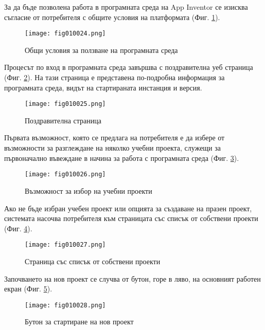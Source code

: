 За да бъде позволена работа в програмната среда на App Inventor се изисква съгласие от потребителя с общите условия на платформата (Фиг. \ref{fig010024}).

\begin{figure}[H]
  \centering
  \texttt{[image: fig010024.png]}
  \caption{Общи условия за ползване на програмната среда}
\label{fig010024}
\end{figure}

Процесът по вход в програмната среда завършва с поздравителна уеб страница (Фиг. \ref{fig010025}). На тази страница е представена по-подробна информация за програмната среда, видът на стартираната инстанция и версия. 

\begin{figure}[H]
  \centering
  \texttt{[image: fig010025.png]}
  \caption{Поздравителна страница}
\label{fig010025}
\end{figure}

Първата възможност, която се предлага на потребителя е да избере от възможности за разглеждане на няколко учебни проекта, служещи за първоначално въвеждане в начина за работа с програмната среда (Фиг. \ref{fig010026}).

\begin{figure}[H]
  \centering
  \texttt{[image: fig010026.png]}
  \caption{Възможност за избор на учебни проекти}
\label{fig010026}
\end{figure}

Ако не бъде избран учебен проект или опцията за създаване на празен проект, системата насочва потребителя към страницата със списък от собствени проекти (Фиг. \ref{fig010027}).

\begin{figure}[H]
  \centering
  \texttt{[image: fig010027.png]}
  \caption{Страница със списък от собствени проекти}
\label{fig010027}
\end{figure}

Започването на нов проект се случва от бутон, горе в ляво, на основният работен екран (Фиг. \ref{fig010028}).

\begin{figure}[H]
  \centering
  \texttt{[image: fig010028.png]}
  \caption{Бутон за стартиране на нов проект}
\label{fig010028}
\end{figure}

